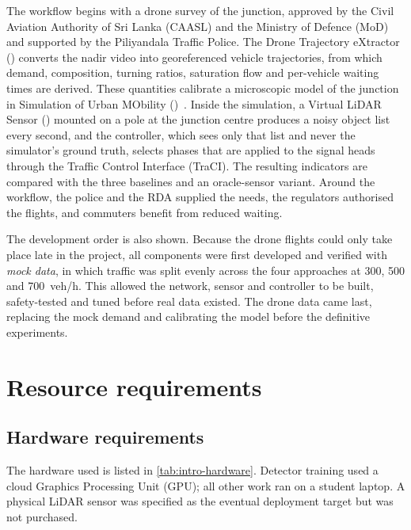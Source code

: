 The workflow begins with a drone survey of the junction, approved by the Civil Aviation Authority of Sri Lanka (CAASL) and the Ministry of Defence (MoD) and supported by the Piliyandala Traffic Police. The Drone Trajectory eXtractor (\dtx{}) converts the nadir video into georeferenced vehicle trajectories, from which demand, composition, turning ratios, saturation flow and per-vehicle waiting times are derived. These quantities calibrate a microscopic model of the junction in Simulation of Urban MObility (\sumo{})~\cite{lopez2018sumo}. Inside the simulation, a Virtual LiDAR Sensor (\vls{}) mounted on a pole at the junction centre produces a noisy object list every second, and the \prism{} controller, which sees only that list and never the simulator's ground truth, selects phases that are applied to the signal heads through the Traffic Control Interface (TraCI). The resulting indicators are compared with the three baselines and an oracle-sensor variant. Around the workflow, the police and the RDA supplied the needs, the regulators authorised the flights, and commuters benefit from reduced waiting.

The development order is also shown. Because the drone flights could only take place late in the project, all components were first developed and verified with \emph{mock data}, in which traffic was split evenly across the four approaches at 300, 500 and 700~veh/h. This allowed the network, sensor and controller to be built, safety-tested and tuned before real data existed. The drone data came last, replacing the mock demand and calibrating the model before the definitive experiments.

\section{Resource requirements}\label{sec:intro-resources}

\subsection{Hardware requirements}\label{sec:intro-hardware}

The hardware used is listed in \cref{tab:intro-hardware}. Detector training used a cloud Graphics Processing Unit (GPU); all other work ran on a student laptop. A physical LiDAR sensor was specified as the eventual deployment target but was not purchased.


